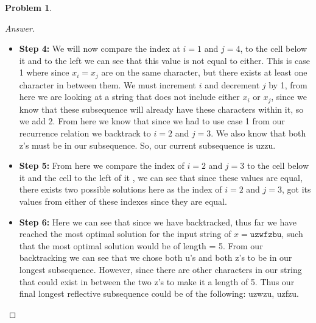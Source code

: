 \documentclass[11pt]{article}
\theoremstyle{definition}
\theoremstyle{definition}
\newtheorem{required}{Problem}
\theoremstyle{definition}
\begin{document}
\begin{required}
\begin{enumerate}[label=(\alph*)]
\begin{proof}[Answer]
\begin {itemize}
\item \textbf{Step 4:} We will now compare the index at $i = 1$ and $j = 4$, to the cell below it and to the left we can see that this value is not equal to either. This is case 1 where since $x_i=x_j$ are on the same character, but there exists at least one character in between them. We must increment $i$ and decrement $j$ by 1, from here we are looking at a string that does not include either $x_i$ or $x_j$, since we know that these subsequence will already have these characters within it, so we add 2. From here we know that since we had to use case 1 from our recurrence relation we backtrack to $i = 2$ and $j = 3$. We also know that both z's must be in our subsequence. So, our current subsequence is uzzu.\\

\item \textbf{Step 5:} From here we compare the index of $i = 2$ and $j = 3$ to the cell below it and the cell to the left of it , we can see that since these values are equal, there exists two possible solutions here as the index of $i = 2$ and $j = 3$, got its values from either of these indexes since they are equal. 

\item \textbf{Step 6:} Here we can see that since we have backtracked, thus far we have reached the most optimal solution for the input string of $x = \texttt{uzwfzbu} $, such that the most optimal solution would be of length = 5. From our backtracking we can see that we chose both u's and both z's to be in our longest subsequence. However, since there are other characters in our string that could exist in between the two z's to make it a length of 5. Thus our final longest reflective subsequence could be of the following: uzwzu, uzfzu.

\end{itemize}
\end{proof}
\end{enumerate}
\end{required}

\end{document}
